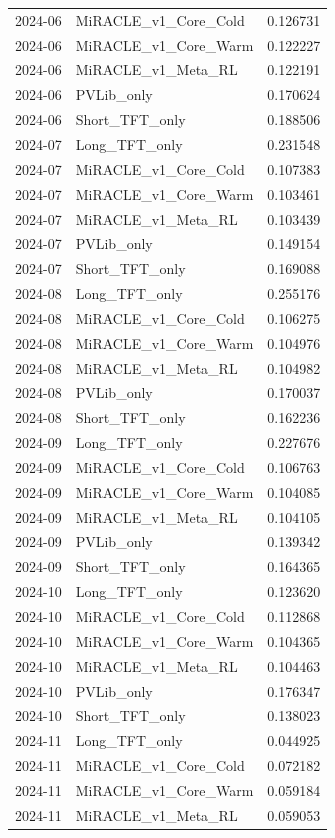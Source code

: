 \begin{tabular}{llr}
2024-06 & MiRACLE_v1_Core_Cold & 0.126731 \\
2024-06 & MiRACLE_v1_Core_Warm & 0.122227 \\
2024-06 & MiRACLE_v1_Meta_RL & 0.122191 \\
2024-06 & PVLib_only & 0.170624 \\
2024-06 & Short_TFT_only & 0.188506 \\
2024-07 & Long_TFT_only & 0.231548 \\
2024-07 & MiRACLE_v1_Core_Cold & 0.107383 \\
2024-07 & MiRACLE_v1_Core_Warm & 0.103461 \\
2024-07 & MiRACLE_v1_Meta_RL & 0.103439 \\
2024-07 & PVLib_only & 0.149154 \\
2024-07 & Short_TFT_only & 0.169088 \\
2024-08 & Long_TFT_only & 0.255176 \\
2024-08 & MiRACLE_v1_Core_Cold & 0.106275 \\
2024-08 & MiRACLE_v1_Core_Warm & 0.104976 \\
2024-08 & MiRACLE_v1_Meta_RL & 0.104982 \\
2024-08 & PVLib_only & 0.170037 \\
2024-08 & Short_TFT_only & 0.162236 \\
2024-09 & Long_TFT_only & 0.227676 \\
2024-09 & MiRACLE_v1_Core_Cold & 0.106763 \\
2024-09 & MiRACLE_v1_Core_Warm & 0.104085 \\
2024-09 & MiRACLE_v1_Meta_RL & 0.104105 \\
2024-09 & PVLib_only & 0.139342 \\
2024-09 & Short_TFT_only & 0.164365 \\
2024-10 & Long_TFT_only & 0.123620 \\
2024-10 & MiRACLE_v1_Core_Cold & 0.112868 \\
2024-10 & MiRACLE_v1_Core_Warm & 0.104365 \\
2024-10 & MiRACLE_v1_Meta_RL & 0.104463 \\
2024-10 & PVLib_only & 0.176347 \\
2024-10 & Short_TFT_only & 0.138023 \\
2024-11 & Long_TFT_only & 0.044925 \\
2024-11 & MiRACLE_v1_Core_Cold & 0.072182 \\
2024-11 & MiRACLE_v1_Core_Warm & 0.059184 \\
2024-11 & MiRACLE_v1_Meta_RL & 0.059053 \\

\end{tabular}
